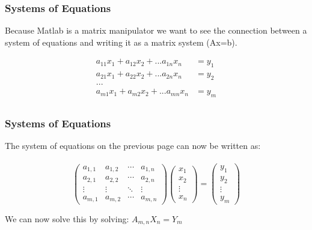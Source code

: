 \documentclass{beamer}
\begin{document}
\begin{frame}
\frametitle{Systems of Equations}

Because Matlab is a matrix manipulator we want to see the connection between a system of equations and writing it as a matrix system (Ax=b).

\begin{align*}
a_{11}x_1 + a_{12}x_2 + ... a_{1n}x_n &= y_1\\  
a_{21}x_1 + a_{22}x_2 + ... a_{2n}x_n &= y_2\\  
...\\
a_{m1}x_1 + a_{m2}x_2 + ... a_{mn}x_n &= y_m\\
\end{align*}  


\end{frame}

\begin{frame}
\frametitle{Systems of Equations}

The system of equations on the previous page can now be written as:
\ \\
\ \\
$$
\begin{pmatrix}
  a_{1,1} & a_{1,2} & \cdots & a_{1,n} \\
  a_{2,1} & a_{2,2} & \cdots & a_{2,n} \\
  \vdots  & \vdots  & \ddots & \vdots  \\
  a_{m,1} & a_{m,2} & \cdots & a_{m,n}
  \end{pmatrix}
\begin{pmatrix}
 x_1\\
 x_2\\
 \vdots\\
 x_n
\end{pmatrix}
= 
\begin{pmatrix}
y_1\\
y_2\\
\vdots\\
y_m
\end{pmatrix}
 $$
 
 We can now solve this by solving: $ A_{m,n} X_n = Y_m$
\end{frame}
\end{document}
